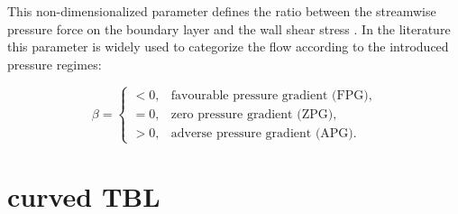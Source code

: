 This non-dimensionalized parameter defines the ratio between the streamwise pressure force on the boundary layer and the wall shear stress \citep{clauser_turbulent_1954}.
In the literature this parameter is widely used to categorize the flow according to the introduced pressure regimes:

\begin{equation}
    \beta =
    \begin{cases}
        < 0, & \text{favourable pressure gradient (FPG)}, \\
        = 0, & \text{zero pressure gradient (ZPG)}, \\
        > 0, & \text{adverse pressure gradient (APG)}.
    \end{cases}
\end{equation}




\section{curved TBL}

